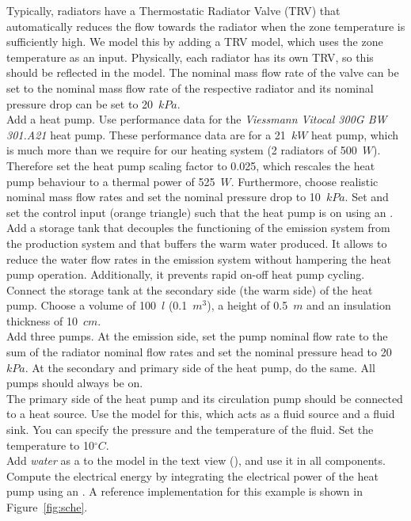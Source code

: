 \documentclass[10pt,a4paper]{article}
\begin{document}
Typically, radiators have a Thermostatic Radiator Valve (TRV)
that automatically reduces the flow towards the radiator
when the zone temperature is sufficiently high.
We model this by adding a TRV model, which uses
the zone temperature  as an input.
Physically, each radiator has its own TRV, 
so this should be reflected in the model.
The nominal mass flow rate of the valve can be set to the nominal
mass flow rate of the respective radiator and its nominal pressure drop can be set 
to 20~$kPa$.\\

Add a heat pump. 
Use performance data for the \textit{Viessmann Vitocal 300G BW 301.A21} heat pump.
These performance data are for a 21~$kW$ heat pump, 
which is much more than we require for our heating system (2 radiators of 500~$W$).
Therefore set the heat pump scaling factor to 0.025, 
which rescales the heat pump behaviour to a thermal power of 525~$W$.
Furthermore, choose realistic nominal mass flow rates and set the nominal pressure
drop to 10~$kPa$. Set  and set the control input (orange triangle)
such that the heat pump is on using an .\\

Add a storage tank that decouples the functioning of the emission system from the production system and that buffers the warm water produced. 
It allows to reduce the water flow rates in the emission system without hampering the heat pump operation. 
Additionally, it prevents rapid on-off heat pump cycling.
Connect the storage tank at the secondary side (the warm side) of the heat pump.
Choose a volume of 100~$l$ (0.1~$m^3$), a height of 0.5~$m$ and an insulation thickness of 10~$cm$.\\

Add three pumps.
At the emission side,
set the pump nominal flow rate to the sum of the radiator nominal flow rates
and set the nominal pressure head to 20~$kPa$.
At the secondary and primary side of the heat pump, do the same.
All pumps should always be on.\\

The primary side of the heat pump and its circulation pump should be connected
to a heat source. Use the model  for this,
which acts as a fluid source and a fluid sink. You can specify the pressure
and the temperature of the fluid. Set the temperature to 10$^{\circ}C$.\\

Add \textit{water} as a  to the model 
in the text view (), and use it in all components. Compute the electrical energy by integrating the electrical power of the heat pump
using an . A reference implementation for this example is shown in Figure~\ref{fig:sche}.
\end{document}
